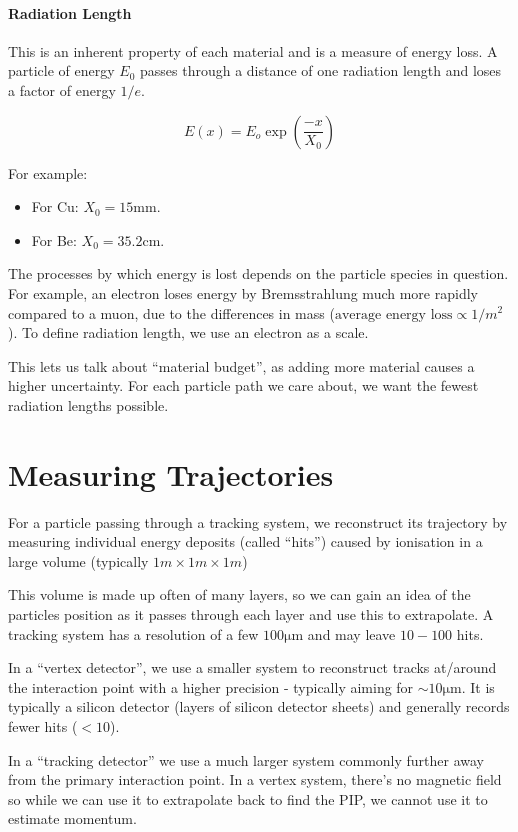 \paragraph{Radiation Length} This is an inherent property of each material and is a measure of energy loss. A particle of energy $E_0$ passes through a distance of one radiation length and loses a factor of energy $1/e$.

\[
    E(x) = E_o \exp \left(\frac{-x}{X_0}\right)
\]

For example:
\begin{itemize}
    \item For Cu: $X_0 = 15$mm.
    \item For Be: $X_0 = 35.2$cm.
\end{itemize}

The processes by which energy is lost depends on the particle species in question. For example, an electron loses energy by Bremsstrahlung much more rapidly compared to a muon, due to the differences in mass ($\text{average energy loss} \propto 1/m^2$). To define radiation length, we use an electron as a scale.

This lets us talk about ``material budget'', as adding more material causes a higher uncertainty. For each particle path we care about, we want the fewest radiation lengths possible.

\section{Measuring Trajectories}
For a particle passing through a tracking system, we reconstruct its trajectory by measuring individual energy deposits (called ``hits'') caused by ionisation in a large volume (typically $1\si{m}\times1\si{m}\times1\si{m}$)

This volume is made up often of many layers, so we can gain an idea of the particles position as it passes through each layer and use this to extrapolate. A tracking system has a resolution of a few $100\si{\micro\metre}$ and may leave $10-100$ hits.

In a ``vertex detector'', we use a smaller system to reconstruct tracks at/around the interaction point with a higher precision - typically aiming for $\sim 10 \si{\micro\metre}$. It is typically a silicon detector (layers of silicon detector sheets) and generally records fewer hits ($< 10$).

In a ``tracking detector'' we use a much larger system commonly further away from the primary interaction point. In a vertex system, there's no magnetic field so while we can use it to extrapolate back to find the PIP, we cannot use it to estimate momentum. 

